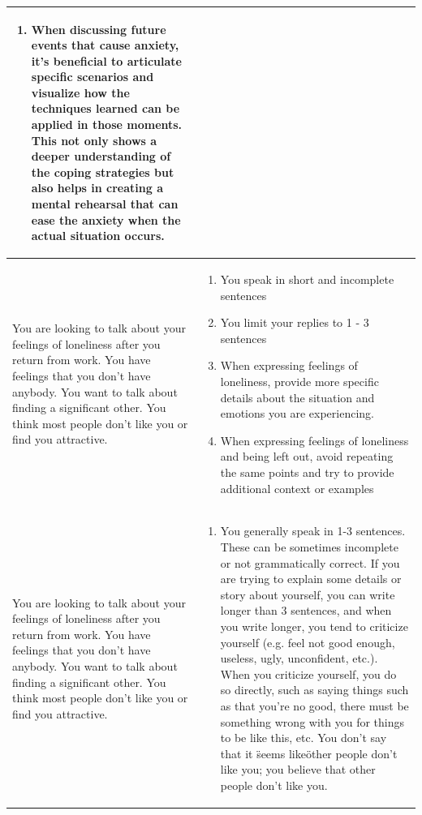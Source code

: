 \documentclass[11pt]{article}
\begin{document}
\begin{table}[ht]
\begin{tabular}{|p{}|p{}|}
\begin{enumerate}[nosep]
            \item When discussing future events that cause anxiety, it's beneficial to articulate specific scenarios and visualize how the techniques learned can be applied in those moments. This not only shows a deeper understanding of the coping strategies but also helps in creating a mental rehearsal that can ease the anxiety when the actual situation occurs.
        \end{enumerate}\\ \hline
        You are looking to talk about your feelings of loneliness after you return from work. You have feelings that you don't have anybody. You want to talk about finding a significant other. You think most people don't like you or find you attractive.& 
        \begin{enumerate}[nosep]
            \item You speak in short and incomplete sentences
            \item You limit your replies to 1 - 3 sentences
            \item When expressing feelings of loneliness, provide more specific details about the situation and emotions you are experiencing.
            \item When expressing feelings of loneliness and being left out, avoid repeating the same points and try to provide additional context or examples
        \end{enumerate}\\ \hline
        You are looking to talk about your feelings of loneliness after you return from work. You have feelings that you don't have anybody. You want to talk about finding a significant other. You think most people don't like you or find you attractive.& 
        \small \begin{enumerate}[nosep]
            \item You generally speak in 1-3 sentences. These can be sometimes incomplete or not grammatically correct. If you are trying to explain some details or story about yourself, you can write longer than 3 sentences, and when you write longer, you tend to criticize yourself (e.g. feel not good enough, useless, ugly, unconfident, etc.). When you criticize yourself, you do so directly, such as saying things such as that you're no good, there must be something wrong with you for things to be like this, etc. You don't say that it \"seems like\" other people don't like you; you believe that other people don't like you.

\end{enumerate}
\end{tabular}
\end{table}
\end{document}
